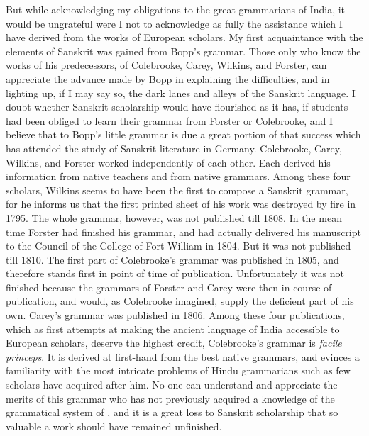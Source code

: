 But while acknowledging my obligations to the great grammarians of
India, it would be ungrateful were I not to acknowledge as fully the
assistance which I have derived from the works of European scholars. My
first acquaintance with the elements of Sanskrit was gained from Bopp's
grammar. Those only who know the works of his predecessors, of
Colebrooke, Carey, Wilkins, and Forster, can appreciate the advance made
by Bopp in explaining the difficulties, and in lighting up, if I may say
so, the dark lanes and alleys of the Sanskrit language. I doubt whether
Sanskrit scholarship would have flourished as it has, if students had
been obliged to learn their grammar from Forster or Colebrooke, and I
believe that to Bopp's little grammar is due a great portion of that
success which has attended the study of Sanskrit literature in Germany.
Colebrooke, Carey, Wilkins, and Forster worked independently of each
other. Each derived his information from native teachers and from native
grammars. Among these four scholars, Wilkins seems to have been the
first to compose a Sanskrit grammar, for he informs us that the first
printed sheet of his work was destroyed by fire in 1795. The whole
grammar, however, was not published till 1808. In the mean time Forster
had finished his grammar, and had actually delivered his manuscript to
the Council of the College of Fort William in 1804. But it was not
published till 1810. The first part of Colebrooke's grammar was
published in 1805, and therefore stands first in point of time of
publication. Unfortunately it was not finished because the grammars of
Forster and Carey were then in course of publication, and would, as
Colebrooke imagined, supply the deficient part of his own. Carey's
grammar was published in 1806. Among these four publications, which as
first attempts at making the ancient language of India accessible to
European scholars, deserve the highest credit, Colebrooke's grammar is
\emph{facile princeps}. It is derived at first-hand from the best native
grammars, and evinces a familiarity with the most intricate problems of
Hindu grammarians such as few scholars have acquired after him. No one
can understand and appreciate the merits of this grammar who has not
previously acquired a knowledge of the grammatical system of \panini{},
and it is a great loss to Sanskrit scholarship that so valuable a work
should have remained unfinished.

